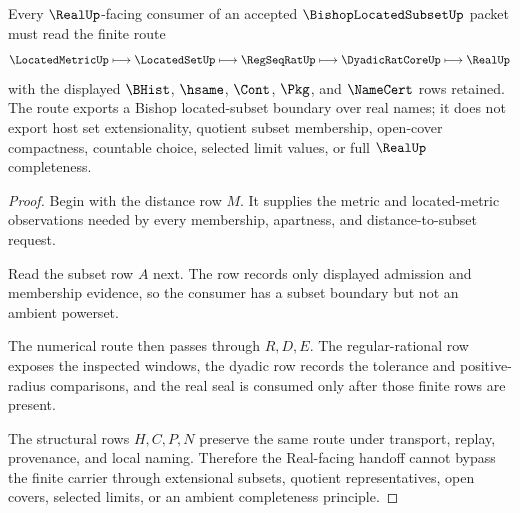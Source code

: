\begin{theorem}
\label{thm:bishop-located-subset-real-seal-route}
Every $\RealUp$-facing consumer of an accepted $\BishopLocatedSubsetUp$ packet must read the finite route
$$
\LocatedMetricUp
\longmapsto
\LocatedSetUp
\longmapsto
\RegSeqRatUp
\longmapsto
\DyadicRatCoreUp
\longmapsto
\RealUp
$$
with the displayed $\BHist$, $\hsame$, $\Cont$, $\Pkg$, and $\NameCert$ rows retained. The route exports a Bishop located-subset boundary over real names; it does not export host set extensionality, quotient subset membership, open-cover compactness, countable choice, selected limit values, or full $\RealUp$ completeness.
\end{theorem}
\begin{proof}
Begin with the distance row $M$. It supplies the metric and located-metric observations needed by every membership, apartness, and distance-to-subset request.

Read the subset row $A$ next. The row records only displayed admission and membership evidence, so the consumer has a subset boundary but not an ambient powerset.

The numerical route then passes through $R,D,E$. The regular-rational row exposes the inspected windows, the dyadic row records the tolerance and positive-radius comparisons, and the real seal is consumed only after those finite rows are present.

The structural rows $H,C,P,N$ preserve the same route under transport, replay, provenance, and local naming. Therefore the Real-facing handoff cannot bypass the finite carrier through extensional subsets, quotient representatives, open covers, selected limits, or an ambient completeness principle.
\end{proof}

